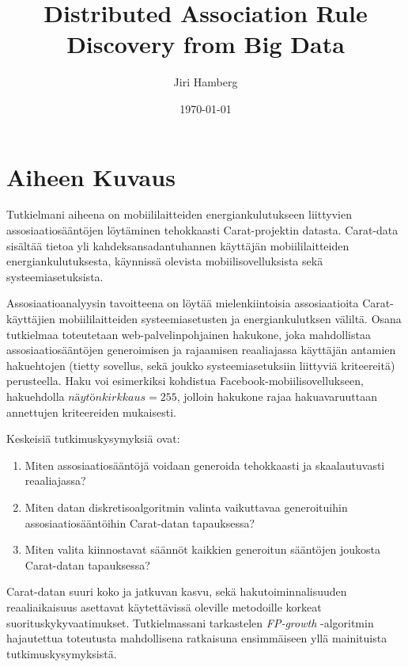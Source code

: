 \documentclass[finnish]{tktltiki2}
\title{Distributed Association Rule Discovery from Big Data}
\author{Jiri Hamberg}
\date{\today}
\theoremstyle{definition}
\theoremstyle{remark}
\begin{document}


\maketitle        %



\mainmatter       %

\section*{Aiheen Kuvaus}

Tutkielmani aiheena on mobiililaitteiden energiankulutukseen liittyvien assosiaatiosääntöjen löytäminen tehokkaasti Carat-projektin datasta. Carat-data sisältää tietoa yli kahdeksansadantuhannen käyttäjän mobiililaitteiden energiankulutuksesta, käynnissä olevista mobiilisovelluksista sekä systeemiasetuksista. 

Assosiaatioanalyysin tavoitteena on löytää mielenkiintoisia assosiaatioita Carat-käyttäjien mobiililaitteiden systeemiasetusten ja energiankulutksen väliltä. Osana tutkielmaa toteutetaan web-palvelinpohjainen hakukone, joka mahdollistaa assosiaatiosääntöjen generoimisen ja rajaamisen reaaliajassa käyttäjän antamien hakuehtojen (tietty sovellus, sekä joukko systeemiasetuksiin liittyviä kriteereitä) perusteella. Haku voi esimerkiksi kohdistua Facebook-mobiilisovellukseen, hakuehdolla $näytönkirkkaus=255$, jolloin hakukone rajaa hakuavaruuttaan annettujen kriteereiden mukaisesti.  

Keskeisiä tutkimuskysymyksiä ovat: 

\begin{enumerate}
	\item Miten assosiaatiosääntöjä voidaan generoida tehokkaasti ja skaalautuvasti reaaliajassa?
	\item Miten datan diskretisoalgoritmin valinta vaikuttavaa generoituihin assosiaatiosääntöihin Carat-datan tapauksessa?
	\item Miten valita kiinnostavat säännöt kaikkien generoitun sääntöjen joukosta Carat-datan tapauksessa? 
\end{enumerate}

Carat-datan suuri koko ja jatkuvan kasvu, sekä hakutoiminnalisuuden reaaliaikaisuus asettavat käytettävissä oleville metodoille korkeat suorituskykyvaatimukset. Tutkielmassani tarkastelen \textit{FP-growth} -algoritmin hajautettua toteutusta mahdollisena ratkaisuna ensimmäiseen yllä mainituista tutkimuskysymyksistä.  
\end{document}
